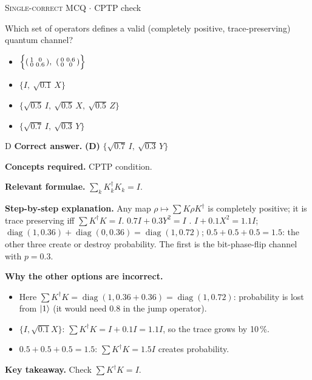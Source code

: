 \documentclass[11pt,a4paper]{article}
\newcommand{\optlabel}[1]{\textbf{(#1)}}
\newcommand{\correctlabel}[1]{\textcolor{okgreen}{\textbf{(#1)}\,\ding{51}}}
\newenvironment{qitem}[1]{\begin{list}{}{\setlength{\leftmargin}{3.3em}\setlength{\labelwidth}{3.1em}%
  \setlength{\labelsep}{0.2em}\setlength{\topsep}{3pt}\setlength{\parsep}{3pt}}\item[\textbf{Q.#1}\hfill]}{\end{list}}
\newcommand{\qsep}{\par\vspace{2pt}{\color{black!15}\hrule}\vspace{4pt}}
\newcommand{\qmeta}[2]{{\footnotesize\color{black!60}\textsc{#1} \;$\cdot$\; #2}\par}
\begin{document}
\begin{qitem}{43}
\qmeta{Single-correct MCQ}{CPTP check}
Which set of operators defines a valid (completely positive, trace-preserving) quantum channel?
\begin{itemize}[leftmargin=2.6em, labelsep=0.4em, itemsep=2pt, topsep=3pt]
\item[\optlabel{A}] $\Big\{\begin{psmallmatrix}1&0\\0&0.6\end{psmallmatrix},\ \begin{psmallmatrix}0&0.6\\0&0\end{psmallmatrix}\Big\}$
\item[\optlabel{B}] $\{I,\ \sqrt{0.1}\,X\}$
\item[\optlabel{C}] $\{\sqrt{0.5}\,I,\ \sqrt{0.5}\,X,\ \sqrt{0.5}\,Z\}$
\item[\correctlabel{D}] $\{\sqrt{0.7}\,I,\ \sqrt{0.3}\,Y\}$
\end{itemize}
\end{qitem}
\begin{solbox}{D}
\textbf{\color{brand}Correct answer.} \textcolor{okgreen}{\textbf{(D)}} $\{\sqrt{0.7}\,I,\ \sqrt{0.3}\,Y\}$

\textbf{\color{brand}Concepts required.} CPTP condition.

\textbf{\color{brand}Relevant formulae.} $\sum_kK_k^\dagger K_k = I$.

\textbf{\color{brand}Step-by-step explanation.} Any map $\rho \mapsto \sum K\rho K^\dagger$ is completely positive; it is trace preserving iff $\sum K^\dagger K = I$.
$0.7I + 0.3Y^2 = I$ \checkmark. $I + 0.1X^2 = 1.1I$; $\operatorname{diag}(1, 0.36) + \operatorname{diag}(0, 0.36) = \operatorname{diag}(1, 0.72)$; $0.5 + 0.5 + 0.5 = 1.5$:
the other three create or destroy probability. The first is the bit-phase-flip channel with $p = 0.3$.

\textbf{\color{brand}Why the other options are incorrect.}
\begin{itemize}[leftmargin=2.4em, itemsep=1pt, topsep=2pt]
\item[\textbf{(A)}] Here $\sum K^\dagger K = \operatorname{diag}(1, 0.36 + 0.36) = \operatorname{diag}(1, 0.72)$: probability is lost from $\ket1$ (it would need $0.8$ in the jump operator).
\item[\textbf{(B)}] $\{I, \sqrt{0.1}X\}$: $\sum K^\dagger K = I + 0.1I = 1.1I$, so the trace grows by 10\,\%.
\item[\textbf{(C)}] $0.5 + 0.5 + 0.5 = 1.5$: $\sum K^\dagger K = 1.5I$ creates probability.
\end{itemize}
\textbf{\color{brand}Key takeaway.} Check $\sum K^\dagger K = I$.
\end{solbox}
\qsep
\end{document}
